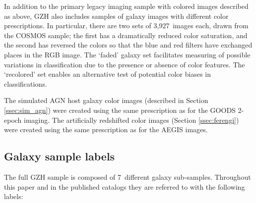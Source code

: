 \documentclass[twocolumn]{aastex6}
\begin{document}
In addition to the primary \hst{} legacy imaging sample with colored images
described as above, GZH also includes samples of \hst{} galaxy images with
different color prescriptions. In particular, there are two sets of 3,927~images
each, drawn from the COSMOS sample; the first has a dramatically reduced color
saturation, and the second has reversed the colors so that the blue and red
filters have exchanged places in the RGB image. The `faded' galaxy set
facilitates measuring of possible variations in classification due to the
presence or absence of color features. The `recolored' set enables an
alternative test of potential color biases in classifications.

The simulated AGN host galaxy color images (described in Section \ref{ssec:sim_agn})
were created using the same prescription as for the GOODS 2-epoch imaging. The
artificially redshifted color images (Section \ref{ssec:ferengi}) were created using the
same prescription as for the AEGIS images.


\subsection{Galaxy sample labels}\label{ssec:sample_labels}

The full GZH sample is composed of 7~different galaxy sub-samples. Throughout
this paper and in the published catalogs they are referred to with the
following labels:
\end{document}
